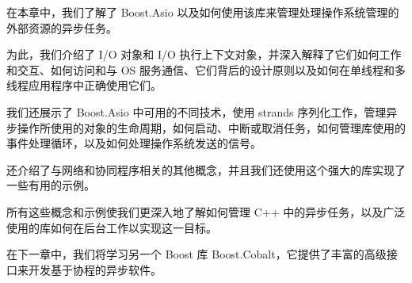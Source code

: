 在本章中，我们了解了 Boost.Asio 以及如何使用该库来管理处理操作系统管理的外部资源的异步任务。

为此，我们介绍了 I/O 对象和 I/O 执行上下文对象，并深入解释了它们如何工作和交互、如何访问和与 OS 服务通信、它们背后的设计原则以及如何在单线程和多线程应用程序中正确使用它们。

我们还展示了 Boost.Asio 中可用的不同技术，使用 strands 序列化工作，管理异步操作所使用的对象的生命周期，如何启动、中断或取消任务，如何管理库使用的事件处理循环，以及如何处理操作系统发送的信号。

还介绍了与网络和协同程序相关的其他概念，并且我们还使用这个强大的库实现了一些有用的示例。

所有这些概念和示例使我们更深入地了解如何管理 C++ 中的异步任务，以及广泛使用的库如何在后台工作以实现这一目标。

在下一章中，我们将学习另一个 Boost 库 Boost.Cobalt，它提供了丰富的高级接口来开发基于协程的异步软件。
